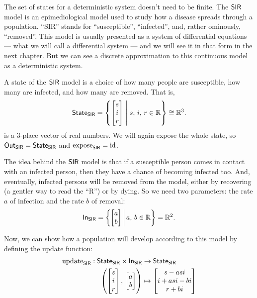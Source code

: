 \documentclass[DynamicalBook]{subfiles}
\begin{document}
\begin{example}\label{ex.SIR_model_discrete}
  The set of states for a deterministic system doesn't need to be finite. The $\mathsf{SIR}$ model
  is an epimediological model used to study how a disease spreads through a
  population. ``SIR'' stands for ``susceptible'', ``infected'', and, rather
  ominously, ``removed''. This model is usually presented as a system of
  differential equations --- what we will call a differential system --- and we will see it in that form in the next chapter.
  But we can see a discrete approximation to this continuous model as a
  deterministic system.

  A state of the $\mathsf{SIR}$ model is a choice of how many people are susceptible, how
  many are infected, and how many are removed. That is,
  $$\mathsf{State}_{\mathsf{SIR}} = \left\{\begin{bmatrix} s \\ i \\ r \end{bmatrix}\; \middle|\; s,\, i,\, r\in \mathbb{R}\right\} \cong \mathbb{R}^3.$$
  is a 3-place vector of real numbers. We will again expose the whole state, so
  $\mathsf{Out}_{\mathsf{SIR}} = \mathsf{State}_{\mathsf{SIR}}$ and $\mathrm{expose}_{\mathsf{SIR}} = \mathrm{id}$.

  The idea behind the $\mathsf{SIR}$ model is that if a susceptible person comes in
  contact with an infected person, then they have a chance of becoming infected
  too. And, eventually, infected persons will be removed from the model, either
  by recovering (a gentler way to read the ``R'') or by dying. So we need two
  parameters: the rate $a$ of infection and the rate $b$ of removal:
  $$\mathsf{In}_{\mathsf{SIR}} = \left\{\begin{bmatrix} a \\ b \end{bmatrix}\, \middle|\, a,\, b \in \mathbb{R}\right\} = \mathbb{R}^2.$$

  Now, we can show how a population will develop according to this model by
  defining the update function:
  \begin{align}\label{eqn.SIR_model_discrete}
    \mathrm{update}_{\mathsf{SIR}} : \mathsf{State}_{\mathsf{SIR}} \times \mathsf{In}_{\mathsf{SIR}} &\to \mathsf{State}_{\mathsf{SIR}}\\
    \left( \begin{bmatrix} s\\ i\\ r\\ \end{bmatrix},\, \begin{bmatrix}a \\ b \end{bmatrix} \right) &\mapsto \begin{bmatrix}s - a s i \\ i + a s i - b  i \\ r + b i \end{bmatrix}
  \end{align}

\end{example}
\end{document}
